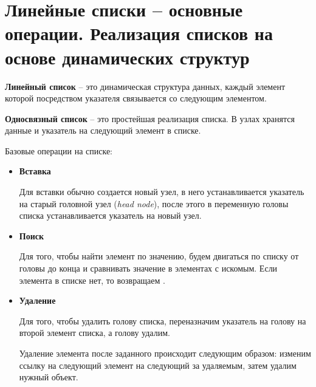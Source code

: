 \section{Линейные списки – основные операции. Реализация списков на основе динамических структур}

\textbf{Линейный список} -- это динамическая структура данных, каждый элемент которой посредством указателя связывается со следующим элементом.

\textbf{Односвязный список} -- это простейшая реализация списка. В узлах хранятся данные и указатель на следующий элемент в списке.

Базовые операции на списке:
\begin{itemize}
    \item
          \textbf{Вставка}

          Для вставки обычно создается новый узел, в него устанавливается указатель на старый головной узел (\textit{head node}), после этого в переменную головы списка устанавливается указатель на новый узел.
    \item
          \textbf{Поиск}

          Для того, чтобы найти элемент по значению, будем двигаться по списку от головы до конца и сравнивать значение в элементах с искомым. Если элемента в списке нет, то возвращаем .
    \item
          \textbf{Удаление}

          Для того, чтобы удалить голову списка, переназначим указатель на голову на второй элемент списка, а голову удалим.

          Удаление элемента после заданного происходит следующим образом: изменим ссылку на следующий элемент на следующий за удаляемым, затем удалим нужный объект.
\end{itemize}

